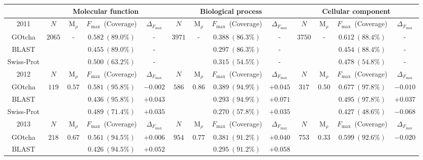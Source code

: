 \begin{tabular}{c|cccc|cccc|cccc}
\hline
& \multicolumn{4}{c|}{Molecular function}
& \multicolumn{4}{c}{Biological process}
& \multicolumn{4}{|c}{Cellular component} \\ \hline \hline
2011 &
$N$ & $\mathrm{M}_{\rho}$ & $F_{\max}$~(Coverage) & $\Delta_{F_{\max}}$ &
$N$ & $\mathrm{M}_{\rho}$ & $F_{\max}$~(Coverage) & $\Delta_{F_{\max}}$ &
$N$ & $\mathrm{M}_{\rho}$ & $F_{\max}$~(Coverage) & $\Delta_{F_{\max}}$ \\ \hline 
GOtcha & 
\multirow{3}{*}{$2065$} & \multirow{3}{*}{-} & $0.582~(89.0\%)$ & - &
\multirow{3}{*}{$3971$} & \multirow{3}{*}{-} & $0.388~(86.3\%)$ & - &
\multirow{3}{*}{$3750$} & \multirow{3}{*}{-} & $0.612~(88.4\%)$ & - \\
BLAST &
& & $0.455~(89.0\%)$ & - &
& & $0.297~(86.3\%)$ & - &
& & $0.454~(88.4\%)$ & - \\
Swiss-Prot &
& & $0.500~(63.2\%)$ & - &
& & $0.315~(54.5\%)$ & - &
& & $0.478~(54.8\%)$ & - \\
\hline
2012 &
$N$ & $\mathrm{M}_{\rho}$ & $F_{\max}$~(Coverage) & $\Delta_{F_{\max}}$ &
$N$ & $\mathrm{M}_{\rho}$ & $F_{\max}$~(Coverage) & $\Delta_{F_{\max}}$ &
$N$ & $\mathrm{M}_{\rho}$ & $F_{\max}$~(Coverage) & $\Delta_{F_{\max}}$ \\ \hline 
GOtcha & 
\multirow{3}{*}{$119$} & \multirow{3}{*}{$0.57$} & $0.581~(95.8\%)$ & $-0.002$ &
\multirow{3}{*}{$586$} & \multirow{3}{*}{$0.86$} & $0.389~(94.9\%)$ & $+0.045$ &
\multirow{3}{*}{$317$} & \multirow{3}{*}{$0.50$} & $0.677~(97.8\%)$ & $-0.010$ \\
BLAST &
& & $0.436~(95.8\%)$ & $+0.043$ &
& & $0.293~(94.9\%)$ & $+0.071$ &
& & $0.495~(97.8\%)$ & $+0.037$ \\
Swiss-Prot &
& & $0.489~(71.4\%)$ & $+0.035$ &
& & $0.270~(57.8\%)$ & $+0.035$ &
& & $0.427~(48.6\%)$ & $-0.068$ \\
\hline
2013 &
$N$ & $\mathrm{M}_{\rho}$ & $F_{\max}$~(Coverage) & $\Delta_{F_{\max}}$ &
$N$ & $\mathrm{M}_{\rho}$ & $F_{\max}$~(Coverage) & $\Delta_{F_{\max}}$ &
$N$ & $\mathrm{M}_{\rho}$ & $F_{\max}$~(Coverage) & $\Delta_{F_{\max}}$ \\ \hline 
GOtcha & 
\multirow{3}{*}{$218$} & \multirow{3}{*}{$0.67$} & $0.561~(94.5\%)$ & $+0.006$ &
\multirow{3}{*}{$954$} & \multirow{3}{*}{$0.77$} & $0.381~(91.2\%)$ & $+0.040$ &
\multirow{3}{*}{$753$} & \multirow{3}{*}{$0.33$} & $0.599~(92.6\%)$ & $-0.020$ \\
BLAST &
& & $0.426~(94.5\%)$ & $+0.052$ &
& & $0.295~(91.2\%)$ & $+0.058$ &

\end{tabular}
